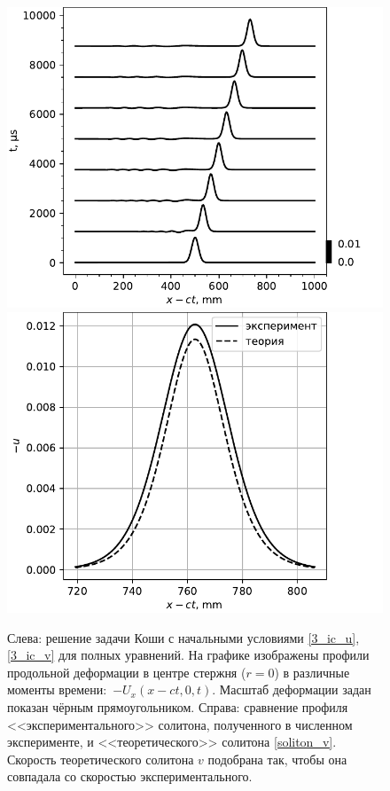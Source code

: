 \documentclass[12pt, a4paper]{report}
\begin{document}
\begin{figure}[h]
	\centering
	\includegraphics[width=0.49\linewidth]{figures/evol}
	\includegraphics[width=0.49\linewidth]{figures/sol_compar}
	\caption{Слева: решение задачи Коши с начальными условиями \eqref{3_ic_u}, \eqref{3_ic_v} для полных уравнений. На графике изображены профили продольной деформации в центре стержня ($r=0$) в различные моменты времени:~$-U_x(x - ct, 0, t)$. Масштаб деформации задан показан чёрным прямоугольником. Справа: сравнение профиля <<экспериментального>> солитона, полученного в численном эксперименте, и <<теоретического>> солитона \eqref{soliton_v}. Скорость теоретического солитона $v$ подобрана так, чтобы она совпадала со скоростью экспериментального.}
	\label{fig:evol_compar1}
\end{figure}
\end{document}
